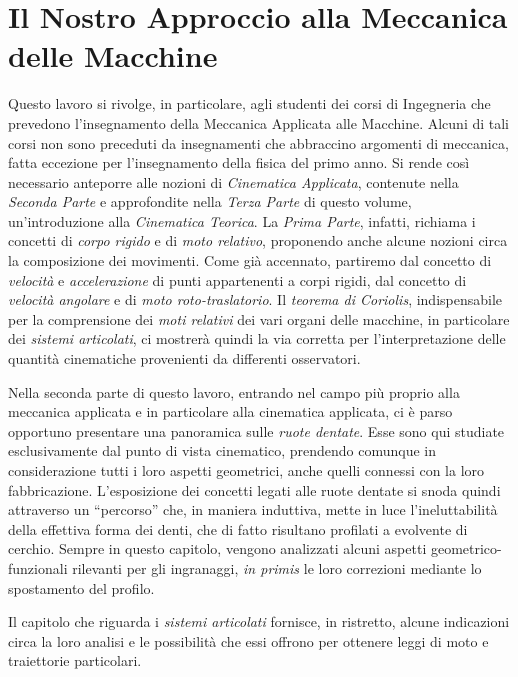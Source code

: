 \section{Il Nostro Approccio alla Meccanica delle  Macchine}
Questo lavoro si rivolge, in particolare, agli studenti dei corsi di
Ingegneria che prevedono l'insegnamento della Meccanica Applicata alle Macchine.
Alcuni di tali corsi non sono preceduti
da insegnamenti che abbraccino argomenti di meccanica,
fatta eccezione per l'insegnamento
della fisica del primo anno. Si rende cos\`i necessario anteporre alle
nozioni di {\em Cinematica Applicata}, contenute nella {\em Seconda Parte} e
approfondite nella {\em Terza Parte}
di questo volume, un'introduzione alla {\em Cinematica Teorica}.
La {\em Prima Parte}, infatti, richiama
i concetti di {\em corpo rigido} e di {\em moto relativo},
proponendo anche alcune nozioni circa la composizione
dei movimenti. Come gi\`a accennato, partiremo dal concetto di 
{\em velocit\`a}  e {\em accelerazione} di punti appartenenti a corpi rigidi,
dal concetto di {\em velocit\`a angolare} e di {\em moto roto-traslatorio}. 
Il {\em teorema di Coriolis}, indispensabile per la comprensione
dei {\em moti relativi} dei vari organi
delle macchine, in particolare dei {\em sistemi articolati},
ci mostrer\`a quindi la via corretta per l'interpretazione delle quantit\`a
cinematiche provenienti da differenti osservatori. 


\noindent Nella seconda parte di questo lavoro,
entrando nel campo pi\`u proprio alla meccanica
applicata e in particolare alla cinematica applicata,
ci \`e parso opportuno
presentare una panoramica sulle {\em ruote dentate}. Esse sono qui
studiate esclusivamente dal punto di vista cinematico, prendendo comunque
in considerazione tutti i loro aspetti geometrici, anche quelli connessi
con la loro
fabbricazione. L'esposizione dei concetti legati alle ruote dentate
si snoda quindi attraverso un ``percorso'' che,
in maniera induttiva, mette in luce
l'ineluttabilit\`a della effettiva forma dei denti,
che di fatto risultano profilati a evolvente di cerchio.
Sempre in questo capitolo, vengono analizzati alcuni
aspetti geometrico-funzionali rilevanti per gli ingranaggi,
{\em in primis} le loro
correzioni mediante lo spostamento del profilo.

\noindent Il capitolo che riguarda i {\em sistemi articolati} fornisce,
in ristretto, alcune indicazioni
circa la loro analisi e le possibilit\`a che essi offrono per ottenere
leggi di moto e traiettorie particolari.

